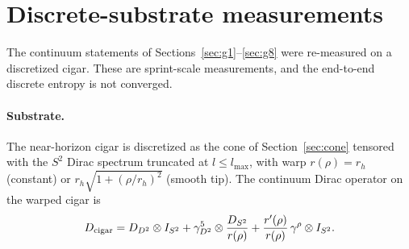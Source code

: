 \documentclass[11pt,a4paper]{article}
\theoremstyle{plain}
\theoremstyle{definition}
\renewcommand{\_}{\textunderscore\allowbreak}
\begin{document}
\section{Discrete-substrate measurements}
\label{sec:discrete}

The continuum statements of Sections~\ref{sec:g1}--\ref{sec:g8} were
re-measured on a discretized cigar. These are sprint-scale measurements,
and the end-to-end discrete entropy is not converged.

\paragraph{Substrate.} The near-horizon cigar is discretized as the cone
of Section~\ref{sec:cone} tensored with the $S^2$ Dirac spectrum truncated
at $l \le l_{\max}$, with warp $r(\rho) = r_h$ (constant) or
$r_h\sqrt{1 + (\rho/r_h)^2}$ (smooth tip). The continuum Dirac operator on
the warped cigar is
\begin{equation}
  D_{\rm cigar}
  = D_{D^2} \otimes I_{S^2}
  + \gamma^5_{D^2} \otimes \frac{D_{S^2}}{r(\rho)}
  + \frac{r'(\rho)}{r(\rho)}\, \gamma^\rho \otimes I_{S^2}.
  \label{eq:cigar_dirac}
\end{equation}
\end{document}
